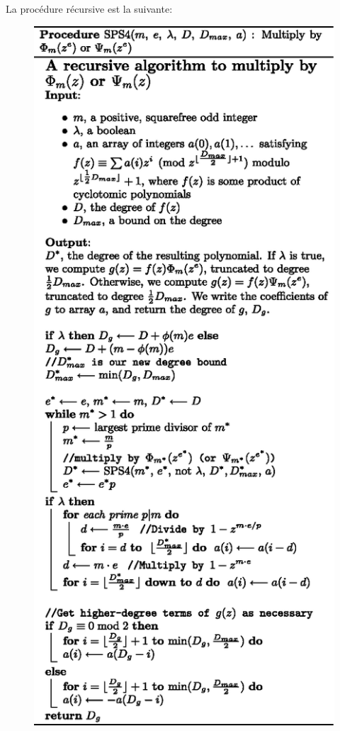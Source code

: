 \documentclass{article}
\theoremstyle{break}                  %
\begin{document}
\par La procédure récursive est la suivante:

\begin{figure}[H]
	\centering
	\includegraphics{cyclotomic-highperf-sps4.eps}
\end{figure}
\end{document}
